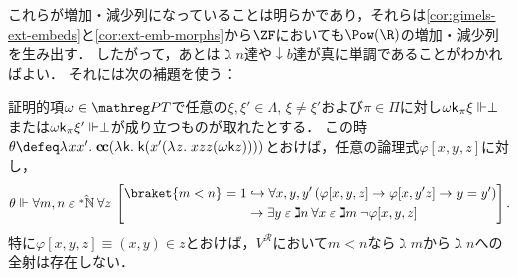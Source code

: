 \documentclass[realisability.tex]{subfiles}
\begin{document}
これらが増加・減少列になっていることは明らかであり，それらは\cref{cor:gimels-ext-embeds}と\cref{cor:ext-emb-morphs}から$\ZF$においても$\Pow(\R)$の増加・減少列を生み出す．
したがって，あとは$\gimel n$達や$\downarrow b$達が真に単調であることがわかればよい．
それには次の補題を使う：

\begin{lemma}\label{lem:gimel-n-incr}
 証明的項$\omega \in \PT$で任意の$\xi, \xi' \in \Lambda$, $\xi \neq \xi'$および$\pi \in \Pi$に対し$\omega \mathsf{k}_\pi \xi \Vdash \perp$または$\omega\mathsf{k}_\pi \xi' \Vdash \perp$が成り立つものが取れたとする．
 この時$\theta \defeq \abs{x x'}{\cc (\abs{\conti}{\conti (x'(\abs{z}{xzz(\omega \conti z)}))})}$とおけば，任意の論理式$\varphi[x,y,z]$に対し，
 \[
  \theta \Vdash \forall m, n \strin \hat{\NN}\: \forall z \:
   \left[\begin{split}
          \braket{m < n} = 1 &\hookrightarrow
          \forall x, y, y' \left( \varphi[x,y,z] \to \varphi[x, y' z] \to y = y'\right)\\
         &\to \exists y \strin \gimel n \: \forall x \strin \gimel m \: \neg \varphi[x,y,z]
  \end{split}\right].
 \]
 特に$\varphi[x, y, z] \equiv (x, y) \in z$とおけば，$V^{\mathcal{R}}$において$m < n$なら$\gimel m$から$\gimel n$への全射は存在しない．
\end{lemma}
\end{document}
